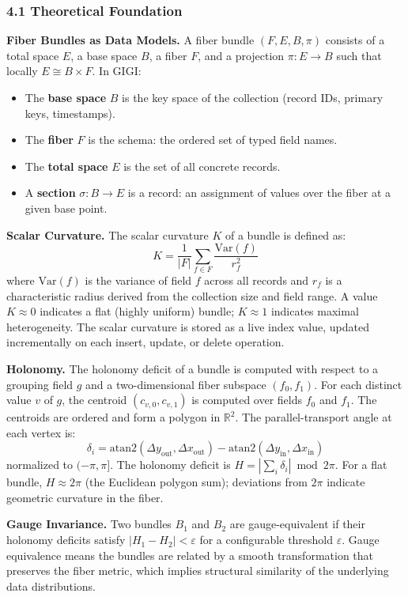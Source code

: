 \documentclass[11pt,letterpaper]{article}
\begin{document}
\subsubsection*{4.1 Theoretical Foundation}

\textbf{Fiber Bundles as Data Models.} A fiber bundle $(F, E, B, \pi)$ consists of a total space $E$, a base space $B$, a fiber $F$, and a projection $\pi: E \to B$ such that locally $E \cong B \times F$. In GIGI:
\begin{itemize}[nosep]
  \item The \textbf{base space} $B$ is the key space of the collection (record IDs, primary keys, timestamps).
  \item The \textbf{fiber} $F$ is the schema: the ordered set of typed field names.
  \item The \textbf{total space} $E$ is the set of all concrete records.
  \item A \textbf{section} $\sigma: B \to E$ is a record: an assignment of values over the fiber at a given base point.
\end{itemize}

\textbf{Scalar Curvature.} The scalar curvature $K$ of a bundle is defined as:
\[
K = \frac{1}{|F|} \sum_{f \in F} \frac{\mathrm{Var}(f)}{r_f^2}
\]
where $\mathrm{Var}(f)$ is the variance of field $f$ across all records and $r_f$ is a characteristic radius derived from the collection size and field range. A value $K \approx 0$ indicates a flat (highly uniform) bundle; $K \approx 1$ indicates maximal heterogeneity. The scalar curvature is stored as a live index value, updated incrementally on each insert, update, or delete operation.

\textbf{Holonomy.} The holonomy deficit of a bundle is computed with respect to a grouping field $g$ and a two-dimensional fiber subspace $(f_0, f_1)$. For each distinct value $v$ of $g$, the centroid $(c_{v,0}, c_{v,1})$ is computed over fields $f_0$ and $f_1$. The centroids are ordered and form a polygon in $\mathbb{R}^2$. The parallel-transport angle at each vertex is:
\[
\delta_i = \mathrm{atan2}(\Delta y_{\mathrm{out}}, \Delta x_{\mathrm{out}}) - \mathrm{atan2}(\Delta y_{\mathrm{in}}, \Delta x_{\mathrm{in}})
\]
normalized to $(-\pi, \pi]$. The holonomy deficit is $H = \left|\sum_i \delta_i\right| \bmod 2\pi$. For a flat bundle, $H \approx 2\pi$ (the Euclidean polygon sum); deviations from $2\pi$ indicate geometric curvature in the fiber.

\textbf{Gauge Invariance.} Two bundles $B_1$ and $B_2$ are gauge-equivalent if their holonomy deficits satisfy $|H_1 - H_2| < \varepsilon$ for a configurable threshold $\varepsilon$. Gauge equivalence means the bundles are related by a smooth transformation that preserves the fiber metric, which implies structural similarity of the underlying data distributions.
\end{document}
